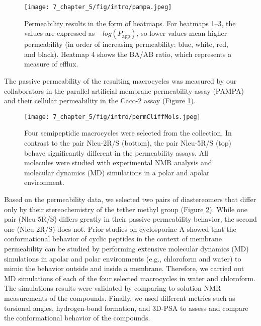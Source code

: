 \begin{figure}[h!]
    \centering
    \texttt{[image: 7\_chapter\_5/fig/intro/pampa.jpeg]}
    \caption{Permeability results in the form of heatmaps. For heatmaps 1–3, the values are expressed as $−log(P_{\text{app}})$, so lower values mean higher permeability (in order of increasing permeability: blue, white, red, and black). Heatmap 4 shows the BA/AB ratio, which represents a measure of efflux.}
    \label{fig:permAssays}
\end{figure}
The passive permeability of the resulting macrocycles was measured by our collaborators in the parallel artificial membrane permeability assay (PAMPA) and their cellular permeability in the Caco-2 assay\cite{Di2015} (Figure \ref{fig:permAssays}).\cite{Comeau2021}

%
\begin{figure}
    \centering
    \texttt{[image: 7\_chapter\_5/fig/intro/permCliffMols.jpeg]}
    \caption{Four semipeptidic macrocycles were selected from the collection. In contrast to the pair Nleu-2R/S (bottom), the pair Nleu-5R/S (top) behave significantly  different in the permeability assays. All molecules were  studied with experimental NMR analysis and molecular dynamics (MD) simulations in a polar and apolar environment.}
    \label{fig:permCMols}
\end{figure}
Based on the permeability data, we selected two pairs of diastereomers that differ only by their stereochemistry of the tether methyl group (Figure \ref{fig:permCMols}). While one pair (Nleu-5R/S) differs greatly in their passive permeability behavior, the second one (Nleu-2R/S) does not. 
Prior studies on cyclosporine A showed that the conformational behavior of cyclic peptides in the context of membrane permeability can be studied by performing extensive molecular dynamics (MD) simulations in apolar and polar environments (e.g., chloroform and water) to mimic the behavior outside and inside a membrane. \cite{Witek2016,Witek2017, Witek2019, Wang2021}
Therefore, we carried out MD simulations of each of the four selected macrocycles in water and chloroform. The simulations results were validated by comparing to solution NMR measurements of the compounds. \cite{Balazs2019}
Finally, we used different metrics such as torsional angles, hydrogen-bond formation, and 3D-PSA\cite{Sebastiano2018} to assess and compare the conformational behavior of the compounds. 